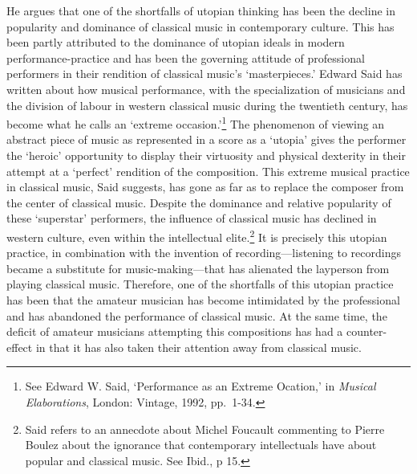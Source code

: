 He argues that one of the shortfalls of utopian thinking has been the decline in popularity and dominance of classical  music in contemporary culture. This has been partly attributed to the dominance of utopian ideals in modern performance-practice and has been the governing attitude of professional performers in their rendition of classical music's `masterpieces.' Edward Said has written about how musical performance, with the specialization of musicians and the division of labour in western classical music during the twentieth century, has become what he calls an `extreme occasion.'\footnote{See Edward W. Said, `Performance as an Extreme Ocation,' in \emph{Musical Elaborations}, London: Vintage, 1992, \mbox{pp. 1-34}.} The phenomenon of viewing an abstract piece of music as represented in a score as a `utopia' gives the performer the `heroic' opportunity to display their virtuosity and physical dexterity in their attempt at a `perfect' rendition of the composition. This extreme musical practice in classical music, Said suggests, has gone as far as to replace the composer from the center of classical music. Despite the dominance and relative popularity of these `superstar' performers, the influence of classical music has declined in western culture, even within the intellectual elite.\footnote{Said refers to an annecdote about Michel Foucault commenting to Pierre Boulez about the ignorance that contemporary intellectuals have about popular and classical music. See Ibid., p 15.} It is precisely this utopian practice, in combination with the invention of recording---listening to recordings became a substitute for music-making---that has alienated the layperson from playing classical music. Therefore, one of the shortfalls of this utopian practice has been that the amateur musician has become intimidated by the professional and has abandoned the performance of classical music. At the same time, the deficit of amateur musicians attempting this compositions has had a counter-effect in that it has also taken their attention away from classical music.


